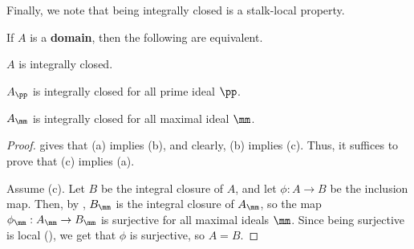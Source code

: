 Finally, we note that being integrally closed is a stalk-local property.
\begin{proposition}
    \label{prop:integrally_closed_local}
    If $A$ is a \textbf{domain}, then the following are equivalent.
    \begin{alphenum}
    \item $A$ is integrally closed.
    \item $A_\pp$ is integrally closed for all prime ideal $\pp$.
    \item $A_\mm$ is integrally closed for all maximal ideal $\mm$.
    \end{alphenum}
\end{proposition}
\begin{proof}
     gives 
    that (a) implies (b), and clearly, (b) implies (c).
    Thus, it suffices to prove that (c) implies (a).

    Assume (c). Let $B$ be the integral closure of $A$,
    and let $\phi : A\to B$ be the inclusion map.
    Then, by ,
    $B_\mm$ is the integral closure of $A_\mm$,
    so the map $\phi_\mm : A_\mm \to B_\mm$
    is surjective for all maximal ideals $\mm$.
    Since being surjective is local (),
    we get that $\phi$ is surjective, so $A=B$.
\end{proof}
